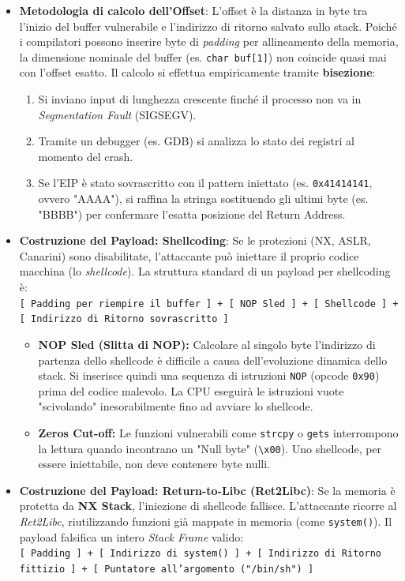 \documentclass[12pt, a4paper]{report}
\begin{document}
\begin{itemize}
	\item \textbf{Metodologia di calcolo dell'Offset}: L'offset è la distanza in byte tra l'inizio del buffer vulnerabile e l'indirizzo di ritorno salvato sullo stack. Poiché i compilatori possono inserire byte di \textit{padding} per allineamento della memoria, la dimensione nominale del buffer (es. \texttt{char buf[1]}) non coincide quasi mai con l'offset esatto. Il calcolo si effettua empiricamente tramite \textbf{bisezione}:
	\begin{enumerate}
		\item Si inviano input di lunghezza crescente finché il processo non va in \textit{Segmentation Fault} (SIGSEGV).
		\item Tramite un debugger (es. GDB) si analizza lo stato dei registri al momento del crash.
		\item Se l'EIP è stato sovrascritto con il pattern iniettato (es. \texttt{0x41414141}, ovvero "AAAA"), si raffina la stringa sostituendo gli ultimi byte (es. "BBBB") per confermare l'esatta posizione del Return Address.
	\end{enumerate}
	
	\item \textbf{Costruzione del Payload: Shellcoding}: Se le protezioni (NX, ASLR, Canarini) sono disabilitate, l'attaccante può iniettare il proprio codice macchina (lo \textit{shellcode}). La struttura standard di un payload per shellcoding è:\\
	\texttt{[ Padding per riempire il buffer ] + [ NOP Sled ] + [ Shellcode ] + [ Indirizzo di Ritorno sovrascritto ]}
	\begin{itemize}
		\item \textbf{NOP Sled (Slitta di NOP):} Calcolare al singolo byte l'indirizzo di partenza dello shellcode è difficile a causa dell'evoluzione dinamica dello stack. Si inserisce quindi una sequenza di istruzioni \texttt{NOP} (opcode \texttt{0x90}) prima del codice malevolo. La CPU eseguirà le istruzioni vuote "scivolando" inesorabilmente fino ad avviare lo shellcode.
		\item \textbf{Zeros Cut-off:} Le funzioni vulnerabili come \texttt{strcpy} o \texttt{gets} interrompono la lettura quando incontrano un "Null byte" (\texttt{\textbackslash x00}). Uno shellcode, per essere iniettabile, non deve contenere byte nulli.
	\end{itemize}
	
	\item \textbf{Costruzione del Payload: Return-to-Libc (Ret2Libc)}: Se la memoria è protetta da \textbf{NX Stack}, l'iniezione di shellcode fallisce. L'attaccante ricorre al \textit{Ret2Libc}, riutilizzando funzioni già mappate in memoria (come \texttt{system()}). Il payload falsifica un intero \textit{Stack Frame} valido:\\
	\texttt{[ Padding ] + [ Indirizzo di system() ] + [ Indirizzo di Ritorno fittizio ] + [ Puntatore all'argomento ("/bin/sh") ]}
	

\end{itemize}
\end{document}
